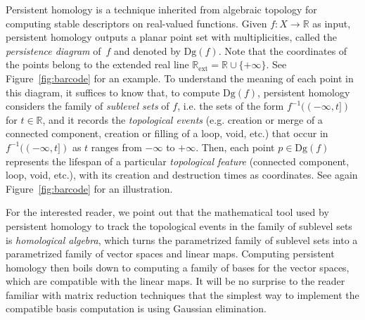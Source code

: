 \documentclass[11pt]{article}
\newcommand{\R}{\mathbb{R}}
\newcommand{\Rext}{\mathbb{R}_{\text{ext}}}
\newcommand{\Dg}{\mathrm{Dg}}
\begin{document}
\begin{figure*}
\centering
{}
\caption{\label{fig:barcode}Sketch of persistent homology: 
(a)~the horizontal lines are the boundaries of sublevel sets $f((-\infty,t])$, which are colored in decreasing shades of grey.
The vertical dotted lines are the boundaries of their different connected components.
For instance, a new connected component is created in the sublevel set $f^{-1}((-\infty,t])$ 
when $t=f(p)$, and it is merged (destroyed) when $t=f(s)$; its lifespan is represented by a copy of the point with coordinates
$(f(p), f(s))$ in the persistence diagram of~$f$ (Figure~(c)); 
(b)~a piecewise-linear approximation $g$ (blue) of the function $f$ (red) from sampled values; 
(c)~superposition of $\Dg(f)$ (red) and $\Dg(g)$ (blue), showing the partial matching of minimum cost (magenta) between the
two persistence diagrams.}
\end{figure*}


Persistent homology is a technique inherited from algebraic
topology for computing stable descriptors on real-valued
functions. Given $f:X\to\R$ as input, persistent homology
outputs a planar point set with multiplicities, called the 
{\em  persistence diagram} of~$f$ and denoted by $\Dg(f)$.
Note that the coordinates of the points belong to the extended real line $\Rext=\R\cup\{+\infty\}$. 
See Figure~\ref{fig:barcode} for an example. 
To understand the meaning of each point in this diagram, it suffices to know that, to compute $\Dg(f)$, 
persistent homology considers the family of {\em sublevel sets} of
$f$, i.e. the sets of the form $f^{-1}((-\infty, t])$ for $t\in\R$,
  and it records the {\em topological events} (e.g. creation or merge
  of a connected component, creation or filling of a loop, void, etc.)
  that occur in $f^{-1}((-\infty, t])$ as $t$ ranges from $-\infty$ to
    $+\infty$.  Then, each point $p\in \Dg(f)$ represents the lifespan
    of a particular {\em topological feature} (connected component,
    loop, void, etc.), with its creation and destruction times as
    coordinates. See again Figure~\ref{fig:barcode} for an
    illustration.

For the interested reader, we point out that the mathematical tool
used by persistent homology to track the topological events in the
family of sublevel sets is {\em homological algebra}, which turns the
parametrized family of sublevel sets into a parametrized family of
vector spaces and linear maps. Computing persistent homology then
boils down to computing a family of bases for the vector spaces, which
are compatible with the linear maps. It will be no surprise to the
reader familiar with matrix reduction techniques that the simplest way
to implement the compatible basis computation is using Gaussian elimination. 
\end{document}
